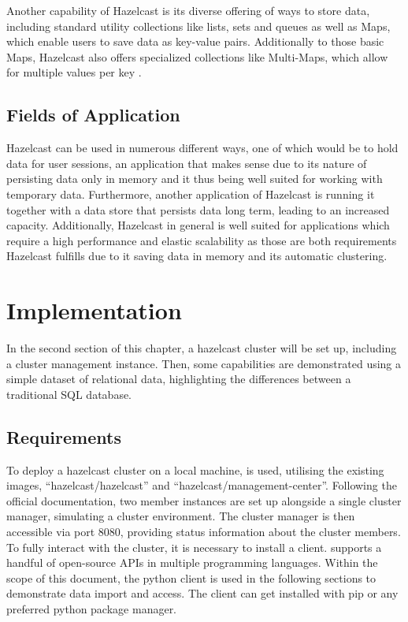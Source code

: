 Another capability of Hazelcast is its diverse offering of ways to store data, including standard utility collections like lists, sets and queues as well as Maps, which enable users to save data as key-value pairs. Additionally to those basic Maps, Hazelcast also offers  
specialized collections like Multi-Maps, which allow for multiple values per key \parencite{Johns.2015}.
\subsection{Fields of Application} \label{subsec:fieldsOfApplicationHazelcast}

Hazelcast can be used in numerous different ways, one of which would be to hold data for user sessions, an application that makes sense due to its nature 
of persisting data only in memory and it thus being well suited for working with temporary data. Furthermore, another application of Hazelcast is 
running it together with a data store that persists data long term, leading to an increased capacity. Additionally, Hazelcast in general is well 
suited for applications which require a high performance and elastic scalability as those are both requirements Hazelcast fulfills due to it saving data in memory and 
its automatic clustering\parencite{Johns.2015}. \newline


\section{Implementation} \label{sec:implementationHazelcast}

In the {\color{red}second} section of this chapter, a hazelcast cluster will be set up, including a cluster management 
instance. Then, some capabilities are demonstrated using a simple dataset of relational data, highlighting 
the differences between a traditional SQL database.

\subsection{Requirements} \label{subsec:requirementsHazelcast}

To deploy a hazelcast cluster on a local machine, \textcite{Hazelcast.Docker.Hazelcast, Hazelcast.Docker.ManagementCenter} is used, utilising the existing images, 
\enquote{hazelcast/hazelcast}  and \enquote{hazelcast/management-center}. 
Following the official documentation, two member instances are set up alongside a single cluster manager, 
simulating a cluster environment. The cluster manager is then accessible via port 8080, providing status 
information about the cluster members. To fully interact with the cluster, it is necessary to install a 
client. \textcite{Hazelcast.Clients} supports a handful of open-source APIs in multiple programming languages. 
Within the scope of this document, the python client is 
used in the following sections to demonstrate data import and access. The client can get installed with pip 
or any preferred python package manager.

